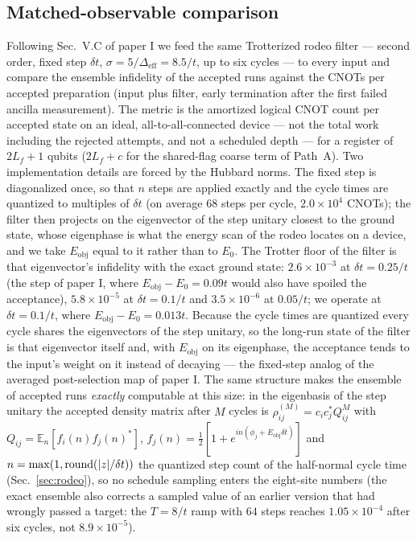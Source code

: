 \documentclass[a4paper,11pt,noarxiv]{quantumarticle}
\newcommand{\Eobj}{E_{\mathrm{obj}}}
\newcommand{\Deff}{\Delta_{\mathrm{eff}}}
\begin{document}
\subsection{Matched-observable comparison}
\label{sec:budget}
Following Sec.~V.C of paper I we feed the same Trotterized rodeo filter ---
second order, fixed step $\delta t$, $\sigma=5/\Deff=8.5/t$, up to six
cycles --- to every input and compare the ensemble infidelity of the
accepted runs against the CNOTs per accepted preparation (input plus
filter, early termination after the first failed ancilla measurement).
The metric is the amortized logical CNOT count per accepted state on an
ideal, all-to-all-connected device --- not the total work including the
rejected attempts, and not a scheduled depth --- for a register of $2L_f+1$
qubits ($2L_f+c$ for the shared-flag coarse term of Path~A).  Two
implementation details are forced by the Hubbard norms.  The fixed step is
diagonalized once, so that $n$ steps are applied exactly and the cycle
times are quantized to multiples of $\delta t$ (on average $68$ steps per
cycle, $2.0\times10^4$ CNOTs); the filter then projects on the eigenvector
of the step unitary closest to the ground state, whose eigenphase is what
the energy scan of the rodeo locates on a device, and we take $\Eobj$
equal to it rather than to $E_0$.  The Trotter floor of the filter is that
eigenvector's infidelity with the exact ground state: $2.6\times10^{-3}$
at $\delta t=0.25/t$ (the step of paper I, where $\Eobj-E_0=0.09t$ would
also have spoiled the acceptance), $5.8\times10^{-5}$ at $\delta t=0.1/t$
and $3.5\times10^{-6}$ at $0.05/t$; we operate at $\delta t=0.1/t$, where
$\Eobj-E_0=0.013t$.  Because the cycle times are quantized every cycle
shares the eigenvectors of the step unitary, so the long-run state of the
filter is that eigenvector itself and, with $\Eobj$ on its eigenphase, the
acceptance tends to the input's weight on it instead of decaying --- the
fixed-step analog of the averaged post-selection map of paper I.  The same
structure makes the ensemble of accepted runs \emph{exactly} computable
at this size: in the eigenbasis of the step unitary the accepted density
matrix after $M$ cycles is $\rho^{(M)}_{ij}=c_ic_j^{*}Q_{ij}^{M}$ with
$Q_{ij}=\mathbb E_n[f_i(n)f_j(n)^{*}]$, $f_j(n)=\tfrac12[1+e^{in(\phi_j+\Eobj\delta t)}]$
and $n=\max(1,\mathrm{round}(\abs{z}/\delta t))$ the quantized step count
of the half-normal cycle time (Sec.~\ref{sec:rodeo}), so no schedule sampling enters the
eight-site numbers (the exact ensemble also corrects a sampled value of an
earlier version that had wrongly passed a target: the $T=8/t$ ramp with
$64$ steps reaches $1.05\times10^{-4}$ after six cycles, not
$8.9\times10^{-5}$).
\end{document}
